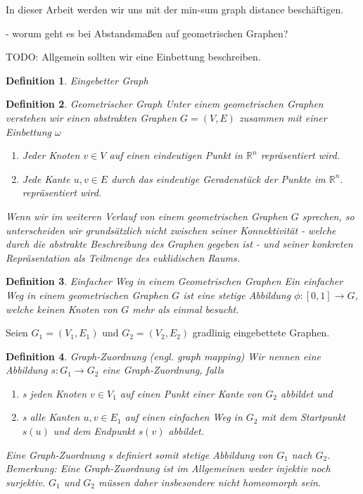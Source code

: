 \documentclass[a4paper, 12pt, twoside]{article}
\theoremstyle{Format1} %
\newtheorem{Def}{Definition}[section]       %
\begin{document}
In dieser Arbeit werden wir uns mit der min-sum graph distance beschäftigen.

- worum geht es bei Abstandsmaßen auf geometrischen Graphen?
\newpage

TODO: Allgemein sollten wir eine Einbettung beschreiben.

\begin{Def}
	Eingebetter Graph
\end{Def}

\begin{Def}
	Geometrischer Graph
	Unter einem geometrischen Graphen verstehen wir einen abstrakten Graphen $G=(V, E)$ zusammen mit einer Einbettung $ \omega $
    	\begin{enumerate}
		\item[1)] Jeder Knoten $v \in V $ auf einen eindeutigen Punkt in $ \mathbb{R}^n $ repräsentiert wird.
		\item[2)] Jede Kante ${u,v} \in E$ durch das eindeutige Geradenstück der Punkte im $ \mathbb{R}^n. $ repräsentiert wird.
    	\end{enumerate}
	Wenn wir im weiteren Verlauf von einem geometrischen Graphen $G$ sprechen, so unterscheiden wir grundsätzlich nicht zwischen seiner Konnektivität -
	welche durch die abstrakte Beschreibung des Graphen gegeben ist - und seiner konkreten Repräsentation als Teilmenge des euklidischen Raums.
\end{Def}

\begin{Def}
	Einfacher Weg in einem Geometrischen Graphen
	Ein \textit{einfacher Weg} in einem geometrischen Graphen $G$ ist eine stetige Abbildung $ \phi: [0, 1] \rightarrow G$, welche keinen Knoten
	von $G$ mehr als einmal besucht.
\end{Def}

Seien $ G_1=(V_1, E_1) $ und $ G_2=(V_2, E_2) $ gradlinig eingebettete Graphen.
\begin{Def}
	Graph-Zuordnung (engl. graph mapping)
	Wir nennen eine Abbildung $s: G_1 \to G_2 $ eine \textit{Graph-Zuordnung}, falls
    	\begin{enumerate}
		\item[1)] s jeden Knoten $ v \in V_1 $ auf einen Punkt einer Kante von $ G_2 $ abbildet und
		\item[2)] s alle Kanten $ {u,v} \in E_1 $ auf einen einfachen Weg in $G_2$ mit dem Startpunkt $s(u)$ und dem Endpunkt $s(v)$ abbildet.
    	\end{enumerate}

	Eine Graph-Zuordnung s definiert somit stetige Abbildung von $ G_1 $ nach $ G_2 $.\\
	Bemerkung: Eine Graph-Zuordnung ist im Allgemeinen weder injektiv noch surjektiv.
	$ G_1 $ und $ G_2 $ müssen daher insbesondere nicht homeomorph sein.

\end{Def}
\end{document}
